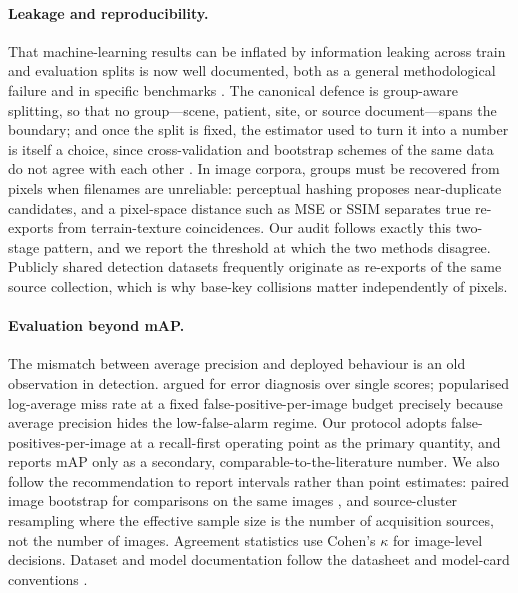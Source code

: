 \paragraph{Leakage and reproducibility.} That machine-learning results can be
inflated by information leaking across train and evaluation splits is now well
documented, both as a general methodological failure
\citep{kapoor2023leakage,kapoor2024reforms,roberts2021pitfalls} and in specific
benchmarks \citep{recht2019imagenet,barz2020train}. The canonical defence is
group-aware splitting, so that no group---scene, patient, site, or source
document---spans the boundary; and once the split is fixed, the estimator used to
turn it into a number is itself a choice, since cross-validation and bootstrap
schemes of the same data do not agree with each other \citep{kohavi1995study}. In
image corpora, groups
must be recovered from pixels when filenames are unreliable: perceptual hashing
\citep{zauner2010phash} proposes near-duplicate candidates, and a pixel-space
distance such as MSE or SSIM \citep{wang2004ssim} separates true re-exports from
terrain-texture coincidences. Our audit follows exactly this two-stage pattern,
and we report the threshold at which the two methods disagree. Publicly shared
detection datasets frequently originate as re-exports of the same source
collection, which is why base-key collisions matter independently of pixels.

\paragraph{Evaluation beyond mAP.} The mismatch between average precision and
deployed behaviour is an old observation in detection. \citet{hoiem2012diagnosing}
argued for error diagnosis over single scores; \citet{dollar2012pedestrian}
popularised log-average miss rate at a fixed false-positive-per-image budget
precisely because average precision hides the low-false-alarm regime. Our
protocol adopts false-positives-per-image at a recall-first operating point as the
primary quantity, and reports mAP only as a secondary, comparable-to-the-literature
number. We also follow the recommendation to report intervals rather than point
estimates: paired image bootstrap for comparisons on the same images
\citep{efron1993bootstrap}, and source-cluster resampling where the effective
sample size is the number of acquisition sources, not the number of images.
Agreement statistics use Cohen's $\kappa$ \citep{cohen1960kappa} for image-level
decisions. Dataset and model documentation follow the datasheet and model-card
conventions \citep{gebru2021datasheets,mitchell2019modelcards}.


